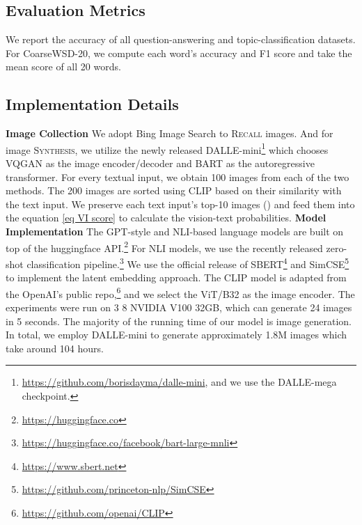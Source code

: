 \documentclass[11pt]{article}
\begin{document}
\subsection{Evaluation Metrics}
We report the accuracy of all question-answering and topic-classification datasets. For CoarseWSD-20, we compute each word's accuracy and F1 score and take the mean score of all 20 words.

\subsection{Implementation Details}
\textbf{Image Collection} We adopt Bing Image Search to \textsc{Recall} images. And for image \textsc{Synthesis}, we utilize the newly released DALLE-mini\footnote{\href{https://github.com/borisdayma/dalle-mini}{https://github.com/borisdayma/dalle-mini}, and we use the DALLE-mega checkpoint.} which chooses VQGAN \cite{esser2021taming} as the image encoder/decoder and BART \cite{lewis-etal-2020-bart} as the autoregressive transformer. For every textual input, we obtain 100 images from each of the two methods. The 200 images are sorted using CLIP based on their similarity with the text input. We preserve each text input's top-10 images () and feed them into the equation \ref{eq VI score} to calculate the vision-text probabilities.
\medbreak
\noindent \textbf{Model Implementation} The GPT-style and NLI-based language models are built on top of the huggingface API.\footnote{\href{https://huggingface.co}{https://huggingface.co}} For NLI models, we use the recently released zero-shot classification pipeline.\footnote{\href{https://huggingface.co/facebook/bart-large-mnli}{https://huggingface.co/facebook/bart-large-mnli}} We use the official release of SBERT\footnote{\href{https://www.sbert.net}{https://www.sbert.net}} and SimCSE\footnote{\href{https://github.com/princeton-nlp/SimCSE}{https://github.com/princeton-nlp/SimCSE}} to implement the latent embedding approach. The CLIP model is adapted from the OpenAI's public repo,\footnote{\href{https://github.com/openai/CLIP}{https://github.com/openai/CLIP}} and we select the ViT/B32 as the image encoder. The experiments were run on 3  8 NVIDIA V100 32GB, which can generate 24 images in 5 seconds. The majority of the running time of our model is image generation. In total, we employ DALLE-mini to generate approximately 1.8M images which take around 104 hours.
\end{document}
